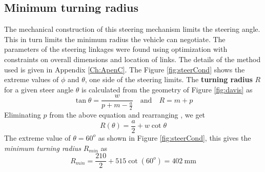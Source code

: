\subsection{Minimum turning radius}
The mechanical construction of this steering mechanism limits the steering angle. This in turn limits the minimum radius the vehicle can negotiate. The parameters of the steering linkages were found using  optimization with constraints on overall dimensions and location  of links. The details of the method used is given in Appendix \ref{Ch:ApenC}. The
Figure \ref{fig:steerCond} shows the extreme values of $\phi$ and $ \theta$, one side of the steering limits. The \textbf{ turning radius } $R$ for a given steer angle $\theta$  is calculated  from the geometry of Figure  \ref{fig:davis} as
\begin{equation*}
\tan\theta =\frac{w}{p+m-\frac{a}{2}} \quad \text{and} \quad R=m+p
\end{equation*}
Eliminating $p$  from the above equation and rearranging , we get 
\begin{equation}
\label{eqn:turningRadius}
R(\theta)=\frac{a}{2}+w\cot\theta
\end{equation}
The extreme value of $\theta=60^o$ as shown in Figure \ref{fig:steerCond}, this gives the \textit{minimum turning radius } $R_{min}$ as
\begin{equation*}
R_{min}=\frac{210}{2}+515  \cot(60^o)=402~\text{mm}
\end{equation*}

